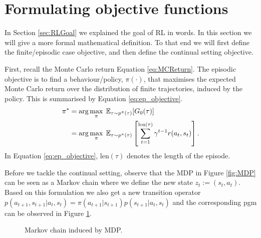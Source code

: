 \documentclass{report}
\numberwithin{equation}{section}
\numberwithin{figure}{section}
\numberwithin{table}{section}
\numberwithin{algorithm}{section}
\begin{document}
\section{Formulating objective functions}\label{sec:RLGoalMaths}
In Section \ref{sec:RLGoal} we explained the goal of RL in words. 
In this section we will give a more formal mathematical definition. 
To that end we will first define the finite/episodic case objective, 
and then define the continual setting objective.

First, recall the Monte Carlo return Equation \ref{eq:MCReturn}. The episodic 
objective is to find a behaviour/policy, $\pi(\cdot)$, that maximises 
the expected Monte Carlo return over the distribution of finite 
trajectories, induced by the policy. 
This is summarised by Equation \ref{eq:ep_objective}.
\begin{align}
  \label{eq:ep_objective}
  \pi^*&=\arg \max_{\pi}\; \mathbb{E}_{\tau\sim p^{\pi}(\tau)}[G_0(\tau)]\notag\\
  &=\arg \max_{\pi}\; \mathbb{E}_{\tau\sim p^{\pi}(\tau)}\left[\sum_{t=1}^{\text{len}(\tau)}\gamma^{t-1}r(a_{t}, s_{t})\right].
\end{align}
In Equation \ref{eq:ep_objective}, $\text{len}(\tau)$ denotes the length of the episode.

Before we tackle the continual setting, observe that the MDP in 
Figure \ref{fig:MDP} can be seen as a Markov chain where we define 
the new state $z_t:=(s_t, a_t)$. Based on this formulation we also 
get a new transition operator 
$p(a_{t+1},s_{t+1}|a_t,s_t)=\pi(a_{t+1}|s_{t+1})p(s_{t+1}|a_t,s_t)$ and 
the corresponding pgm can be observed in Figure \ref{fig:MCz}.

\begin{figure}[H]
  \centering
  \caption{\label{fig:MCz} Markov chain induced by MDP.}
\end{figure}
\end{document}
